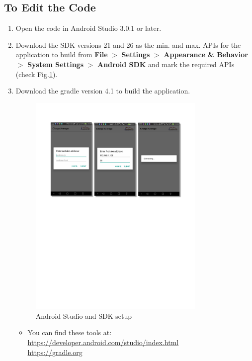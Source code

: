 \subsection{To Edit the Code}
\begin{enumerate}
    \item Open the code in Android Studio 3.0.1 or later.
    \item Download the SDK versions 21 and 26 as the min. and max. APIs for the application to build from \textbf{File} $>$ \textbf{Settings} $>$ \textbf{Appearance \& Behavior} $>$ \textbf{System Settings} $>$ \textbf{Android SDK }and mark the required APIs (check Fig.\ref{fig:SDKsetup}). \\
     \item Download the gradle version 4.1 to build the application.
        \begin{figure}[h]
            \centering
            \includegraphics[width=0.8\textwidth,page=5]{figures/androidFigs}
            \caption{Android Studio and SDK setup}
            \label{fig:SDKsetup}
        \end{figure}
    \begin{itemize}
        \item You can find these tools at:\\
        \url{https://developer.android.com/studio/index.html}\\
        \url{https://gradle.org}
    \end{itemize}
\end{enumerate}


